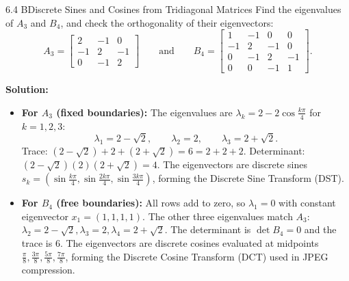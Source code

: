 \documentclass[11pt,a4paper,openany,oneside]{book}
\def\vect#1{#1}%
\def\mathbf#1{#1}%
\newcommand{\vect}[1]{\mathbf{#1}}
\numberwithin{equation}{chapter}
\begin{document}
\begin{example}{6.4 B}{Discrete Sines and Cosines from Tridiagonal Matrices}
Find the eigenvalues of $A_3$ and $B_4$, and check the orthogonality of their eigenvectors:
\[
A_3 = \begin{bmatrix} 2 & -1 & 0 \\ -1 & 2 & -1 \\ 0 & -1 & 2 \end{bmatrix} \qquad \text{and} \qquad B_4 = \begin{bmatrix} 1 & -1 & 0 & 0 \\ -1 & 2 & -1 & 0 \\ 0 & -1 & 2 & -1 \\ 0 & 0 & -1 & 1 \end{bmatrix}.
\]
\end{example}
\textbf{Solution:}
\begin{itemize}
\item \textbf{For $A_3$ (fixed boundaries):} The eigenvalues are $\lambda_k = 2 - 2\cos\frac{k\pi}{4}$ for $k = 1, 2, 3$:
\[
\lambda_1 = 2 - \sqrt{2}, \qquad \lambda_2 = 2, \qquad \lambda_3 = 2 + \sqrt{2}.
\]
Trace: $(2-\sqrt{2}) + 2 + (2+\sqrt{2}) = 6 = 2+2+2$. Determinant: $(2-\sqrt{2})(2)(2+\sqrt{2}) = 4$.
The eigenvectors are discrete sines $\vect{s}_k = (\sin\frac{k\pi}{4}, \sin\frac{2k\pi}{4}, \sin\frac{3k\pi}{4})$, forming the Discrete Sine Transform (DST).
\item \textbf{For $B_4$ (free boundaries):} All rows add to zero, so $\lambda_1 = 0$ with constant eigenvector $\vect{x}_1 = (1, 1, 1, 1)$.
The other three eigenvalues match $A_3$: $\lambda_2 = 2 - \sqrt{2}, \lambda_3 = 2, \lambda_4 = 2 + \sqrt{2}$.
The determinant is $\det B_4 = 0$ and the trace is $6$.
The eigenvectors are discrete cosines evaluated at midpoints $\frac{\pi}{8}, \frac{3\pi}{8}, \frac{5\pi}{8}, \frac{7\pi}{8}$, forming the Discrete Cosine Transform (DCT) used in JPEG compression.
\end{itemize}
\end{document}
